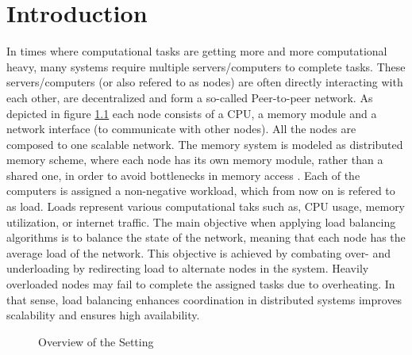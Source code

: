 \chapter{Introduction}\label{chap:introduction}
In times where computational tasks are getting more and more computational heavy, many systems require multiple servers/computers to complete tasks. These servers/computers (or also refered to as nodes) are often directly interacting with each other, are decentralized and form a so-called Peer-to-peer network. As depicted in figure \ref{fig:setting} each node consists of a CPU, a memory module and a network interface (to communicate with other nodes). All the nodes are composed to one scalable network. The memory system is modeled as distributed memory scheme, where each node has its own memory module, rather than a shared one, in order to avoid bottlenecks in memory access \cite{ChengzhongFrancis}. Each of the computers is assigned a non-negative workload, which from now on is refered to as load. Loads represent various computational taks such as, CPU usage, memory utilization, or internet traffic. The main objective when applying load balancing algorithms is to balance the state of the network, meaning that each node has the average load of the network. This objective is achieved by combating over- and underloading by redirecting load to alternate nodes in the system. Heavily overloaded nodes may fail to complete the assigned tasks due to overheating. In that sense, load balancing enhances coordination in distributed systems improves scalability and ensures high availability.

\begin{figure}[]
    \centering
    \caption{Overview of the Setting}
    \label{fig:setting}
\end{figure}

